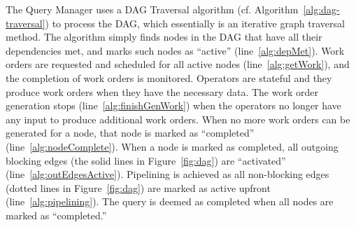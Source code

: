 The Query Manager uses a DAG Traversal algorithm (cf. Algorithm~\ref{alg:dag-traversal}) to process the DAG, which essentially is an iterative graph traversal method. 
The algorithm simply finds nodes in the DAG that have all their dependencies met, and marks such nodes as ``active'' (line~\ref{alg:depMet}).
Work orders are requested and scheduled for all active nodes (line~\ref{alg:getWork}), and 
the completion of work orders is monitored. 
Operators are stateful and they produce work orders when they have the necessary data.
The work order generation stops (line~\ref{alg:finishGenWork}) when the operators no longer have any input to produce additional work orders.
When no more work orders can be generated for a node, that node is marked as 
``completed'' (line~\ref{alg:nodeComplete}). 
When a node is marked as completed, all outgoing blocking edges (the solid lines 
in Figure~\ref{fig:dag}) are ``activated'' (line~\ref{alg:outEdgesActive}). 
Pipelining is achieved as all non-blocking edges (dotted lines in 
Figure~\ref{fig:dag}) are marked as active upfront (line~\ref{alg:pipelining}).
The query is deemed as completed when all nodes are marked as ``completed.''

